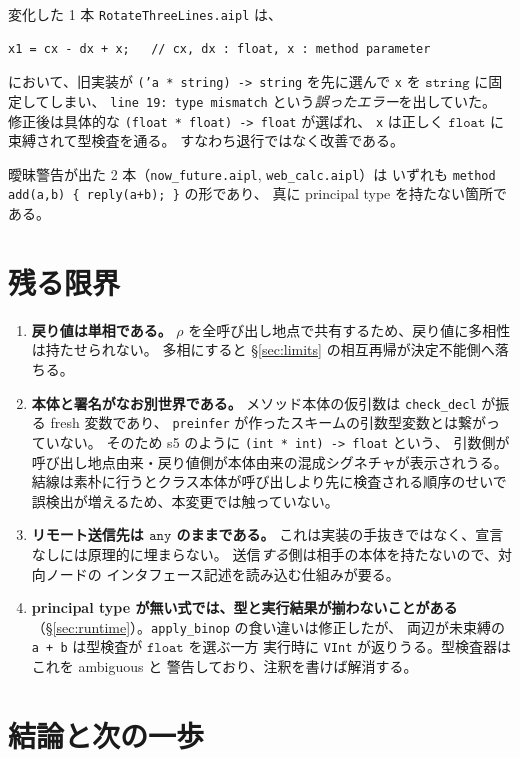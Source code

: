 \documentclass[11pt,a4paper]{ltjsarticle}
\theoremstyle{definition}
\theoremstyle{remark}
\newcommand{\ty}[1]{\ensuremath{\mathtt{#1}}}
\begin{document}
変化した 1 本 \texttt{RotateThreeLines.aipl} は、
\begin{lstlisting}[language=AIPL]
x1 = cx - dx + x;   // cx, dx : float, x : method parameter
\end{lstlisting}
において、旧実装が \texttt{('a * string) -> string} を先に選んで
\texttt{x} を \ty{string} に固定してしまい、
\texttt{line 19: type mismatch} という\emph{誤ったエラー}を出していた。
修正後は具体的な \texttt{(float * float) -> float} が選ばれ、
\texttt{x} は正しく \ty{float} に束縛されて型検査を通る。
すなわち退行ではなく改善である。

曖昧警告が出た 2 本（\texttt{now\_future.aipl}, \texttt{web\_calc.aipl}）は
いずれも \texttt{method add(a,b) \{ reply(a+b); \}} の形であり、
真に principal type を持たない箇所である。

\section{残る限界}
\label{sec:limitations}

\begin{enumerate}
\item \textbf{戻り値は単相である。}
  $\rho$ を全呼び出し地点で共有するため、戻り値に多相性は持たせられない。
  多相にすると \S\ref{sec:limits} の相互再帰が決定不能側へ落ちる。
\item \textbf{本体と署名がなお別世界である。}
  メソッド本体の仮引数は \texttt{check\_decl} が振る fresh 変数であり、
  \texttt{preinfer} が作ったスキームの引数型変数とは繋がっていない。
  そのため s5 のように \texttt{(int * int) -> float} という、
  引数側が呼び出し地点由来・戻り値側が本体由来の混成シグネチャが表示されうる。
  結線は素朴に行うとクラス本体が呼び出しより先に検査される順序のせいで
  誤検出が増えるため、本変更では触っていない。
\item \textbf{リモート送信先は \ty{any} のままである。}
  これは実装の手抜きではなく、宣言なしには原理的に埋まらない。
  送信\emph{する}側は相手の本体を持たないので、対向ノードの
  インタフェース記述を読み込む仕組みが要る。
\item \textbf{principal type が無い式では、型と実行結果が揃わないことがある}
  （\S\ref{sec:runtime}）。\texttt{apply\_binop} の食い違いは修正したが、
  両辺が未束縛の \texttt{a + b} は型検査が \ty{float} を選ぶ一方
  実行時に \texttt{VInt} が返りうる。型検査器はこれを ambiguous と
  警告しており、注釈を書けば解消する。
\end{enumerate}

\section{結論と次の一歩}
\end{document}

